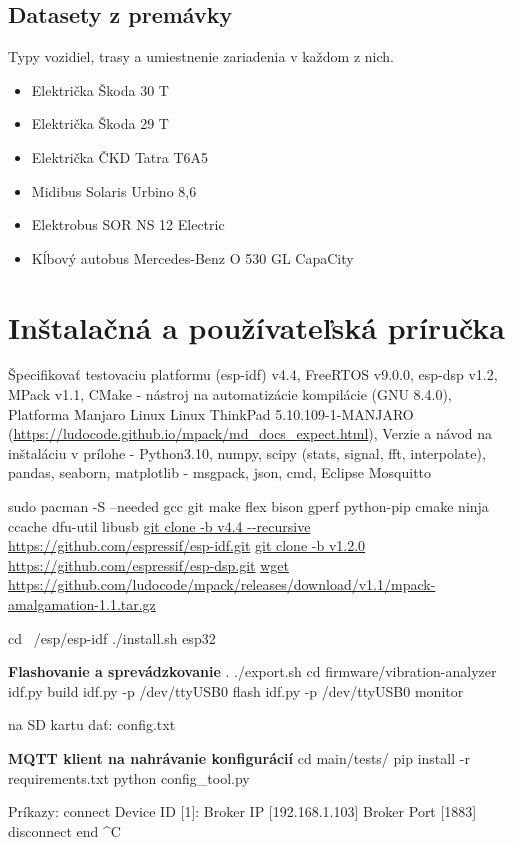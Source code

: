 \section{Datasety z premávky}
Typy vozidiel, trasy a umiestnenie zariadenia v každom z nich.
\begin{itemize}[noitemsep]
\item Električka Škoda 30 T
\item Električka Škoda 29 T
\item Električka ČKD Tatra T6A5
\item Midibus Solaris Urbino 8,6
\item Elektrobus SOR NS 12 Electric
\item Kĺbový autobus Mercedes-Benz O 530 GL CapaCity
\end{itemize}

\thispagestyle{empty}

\chapter{Inštalačná a používateľská príručka}
\renewcommand*{\thepage}{C-\arabic{page}}
Špecifikovať testovaciu platformu
(esp-idf) v4.4, FreeRTOS v9.0.0, esp-dsp v1.2, MPack v1.1, CMake - nástroj na automatizácie kompilácie (GNU 8.4.0), Platforma Manjaro Linux
	Linux ThinkPad 5.10.109-1-MANJARO (\url{https://ludocode.github.io/mpack/md_docs_expect.html}), Verzie a návod na inštaláciu v prílohe
- Python3.10, numpy, scipy (stats, signal, fft, interpolate), pandas, seaborn, matplotlib
- msgpack, json, cmd,  Eclipse Mosquitto

sudo pacman -S --needed gcc git make flex bison gperf python-pip cmake ninja ccache dfu-util libusb
\url{git clone -b v4.4 --recursive https://github.com/espressif/esp-idf.git}
\url{git clone -b v1.2.0 https://github.com/espressif/esp-dsp.git}
\url{wget https://github.com/ludocode/mpack/releases/download/v1.1/mpack-amalgamation-1.1.tar.gz}


cd ~/esp/esp-idf
./install.sh esp32


\textbf{Flashovanie a sprevádzkovanie}
. ./export.sh
cd firmware/vibration-analyzer
idf.py build
idf.py -p /dev/ttyUSB0 flash
idf.py -p /dev/ttyUSB0 monitor

na SD kartu dať: config.txt


\textbf{MQTT klient na nahrávanie konfigurácií}
cd  main/tests/
pip install -r requirements.txt
python config\_tool.py

Príkazy:
	connect
		Device ID [1]:
      	Broker IP [192.168.1.103]
        Broker Port [1883]
	disconnect
	end
	^C

